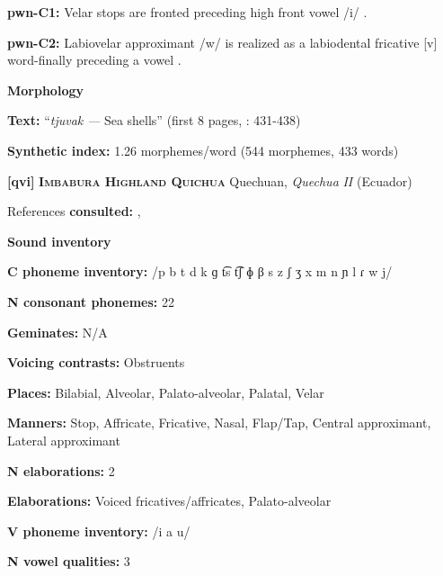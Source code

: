 \textbf{pwn-C1:} Velar stops are fronted preceding high front vowel /i/ \citep[22]{Chang2006}.



\textbf{pwn-C2:} Labiovelar approximant /w/ is realized as a labiodental fricative [v] word-finally preceding a vowel \citep[40]{Chang2006}.



\textbf{Morphology}



\textbf{Text:} “\textit{tjuvak} \textit{—} Sea shells” (first 8 pages, \citealt{Chang2006}: 431-438)



\textbf{Synthetic index:} 1.26 morphemes/word (544 morphemes, 433 words)



\textbf{[qvi]}   \textbf{\textsc{Imbabura Highland Quichua}}    Quechuan, \textit{Quechua} \textit{II} (Ecuador)



References \textbf{consulted:} \citet{Carpenter1982}, \citet{Cole1982}



\textbf{Sound inventory}



\textbf{C phoneme inventory:} /p b t d k ɡ t͡s t͡ʃ ɸ β s z ʃ ʒ x m n ɲ l ɾ w j/



\textbf{N consonant phonemes:} 22



\textbf{Geminates:} N/A



\textbf{Voicing contrasts:} Obstruents



\textbf{Places:} Bilabial, Alveolar, Palato-alveolar, Palatal, Velar



\textbf{Manners:} Stop, Affricate, Fricative, Nasal, Flap/Tap, Central approximant, Lateral approximant



\textbf{N elaborations:} 2



\textbf{Elaborations:} Voiced fricatives/affricates, Palato-alveolar



\textbf{V phoneme inventory:} /i a u/



\textbf{N vowel qualities:} 3



